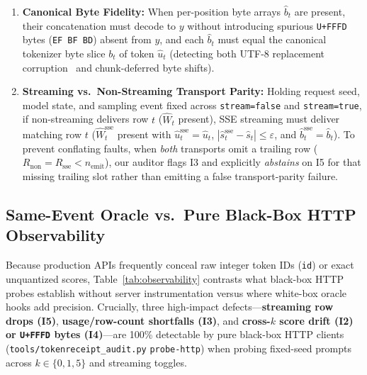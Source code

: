 \documentclass[11pt,letterpaper]{article}
\begin{document}
\begin{enumerate}
\item[\textbf{I4}] \textbf{Canonical Byte Fidelity:} When per-position byte arrays $\hat{b}_t$ are present, their concatenation must decode to $y$ without introducing spurious \texttt{U+FFFD} bytes (\texttt{EF BF BD}) absent from $y$, and each $\hat{b}_t$ must equal the canonical tokenizer byte slice $b_t$ of token $\hat{u}_t$ (detecting both UTF-8 replacement corruption~\cite{ollamabytes,utf8plumbing} and chunk-deferred byte shifts).
\item[\textbf{I5}] \textbf{Streaming vs.\ Non-Streaming Transport Parity:} Holding request seed, model state, and sampling event fixed across \texttt{stream=false} and \texttt{stream=true}, if non-streaming delivers row $t$ ($\hat{W}_t$ present), SSE streaming must deliver matching row $t$ ($\hat{W}_t^{\text{sse}}$ present with $\hat{u}_t^{\text{sse}} = \hat{u}_t$, $|\hat{s}_t^{\text{sse}} - \hat{s}_t| \le \varepsilon$, and $\hat{b}_t^{\text{sse}} = \hat{b}_t$). To prevent conflating faults, when \emph{both} transports omit a trailing row ($R_{\text{non}} = R_{\text{sse}} < n_{\text{emit}}$), our auditor flags \textsc{I3} and explicitly \emph{abstains} on \textsc{I5} for that missing trailing slot rather than emitting a false transport-parity failure.
\end{enumerate}

\subsection{Same-Event Oracle vs.\ Pure Black-Box HTTP Observability}
Because production APIs frequently conceal raw integer token IDs (\texttt{id}) or exact unquantized scores, Table~\ref{tab:observability} contrasts what black-box HTTP probes establish without server instrumentation versus where white-box oracle hooks add precision. Crucially, three high-impact defects---\textbf{streaming row drops (\textsc{I5})}, \textbf{usage/row-count shortfalls (\textsc{I3})}, and \textbf{cross-$k$ score drift (\textsc{I2}) or \texttt{U+FFFD} bytes (\textsc{I4})}---are 100\% detectable by pure black-box HTTP clients (\texttt{tools/tokenreceipt\_audit.py} \texttt{probe-http}) when probing fixed-seed prompts across $k\in\{0,1,5\}$ and streaming toggles.
\end{document}
